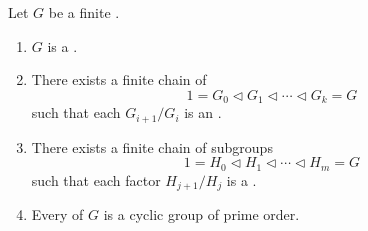 \begin{proposition} \label{proposition:equivalent_formulations_of_solvable_finite_groups}
Let $G$ be a finite . 

\begin{enumerate}
    \item $G$ is a .

    \item There exists a finite chain of 
    $$1 = G_0 \triangleleft G_1 \triangleleft \cdots \triangleleft G_k = G$$
    such that each  $G_{i+1}/G_i$ is an .
    \item There exists a finite chain of subgroups
    $$1 = H_0 \triangleleft H_1 \triangleleft \cdots \triangleleft H_m = G$$
    such that each factor $H_{j+1}/H_j$ is a .

    \item Every  of $G$ is a cyclic group of prime order.
\end{enumerate}
\end{proposition}
